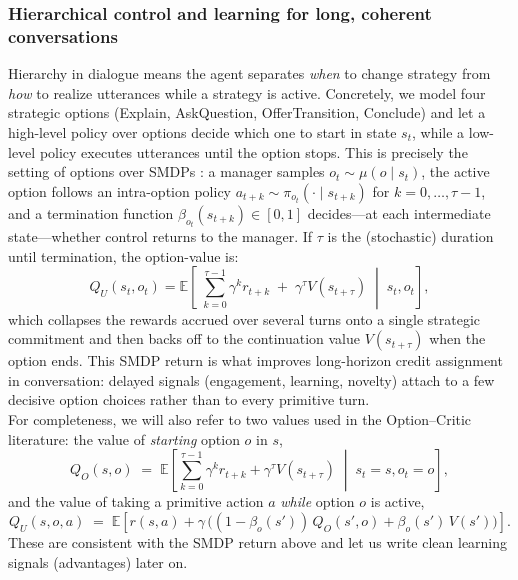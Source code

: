 \documentclass[12pt]{article}
\begin{document}
\subsubsection{Hierarchical control and learning for long, coherent conversations}


Hierarchy in dialogue means the agent separates \emph{when} to change strategy from \emph{how} to realize utterances while a strategy is active. Concretely, we model four strategic options (Explain, AskQuestion, OfferTransition, Conclude) and let a high-level policy over options decide which one to start in state $s_t$, while a low-level policy executes utterances until the option stops. This is precisely the setting of options over SMDPs \citep{sutton1999between}: a manager samples $o_t \sim \mu(o\mid s_t)$, the active option follows an intra-option policy $a_{t+k}\sim \pi_{o_t}(\cdot\mid s_{t+k})$ for $k=0,\ldots,\tau-1$, and a termination function $\beta_{o_t}(s_{t+k})\in[0,1]$ decides—at each intermediate state—whether control returns to the manager. If $\tau$ is the (stochastic) duration until termination, the option-value is:
\[
Q_U(s_t,o_t)=\mathbb{E}\!\left[\;\sum_{k=0}^{\tau-1}\gamma^{k}r_{t+k} \;+\; \gamma^{\tau} V(s_{t+\tau}) \;\middle|\; s_t,o_t\right],
\]
which collapses the rewards accrued over several turns onto a single strategic commitment and then backs off to the continuation value $V(s_{t+\tau})$ when the option ends. This SMDP return is what improves long-horizon credit assignment in conversation: delayed signals (engagement, learning, novelty) attach to a few decisive option choices rather than to every primitive turn.\\

For completeness, we will also refer to two values used in the Option--Critic literature: the value of \emph{starting} option $o$ in $s$,
\[
Q_O(s,o)\;=\;\mathbb{E}\!\left[\sum_{k=0}^{\tau-1}\gamma^{k}r_{t+k}+\gamma^\tau V(s_{t+\tau})\;\middle|\;s_t=s,o_t=o\right],
\]
and the value of taking a primitive action $a$ \emph{while} option $o$ is active,
\[
Q_U(s,o,a)\;=\;\mathbb{E}\!\left[r(s,a)+\gamma\,\bigl((1-\beta_o(s'))\,Q_O(s',o)+\beta_o(s')\,V(s')\bigr)\right].
\]
These are consistent with the SMDP return above and let us write clean learning signals (advantages) later on.\\
\end{document}
